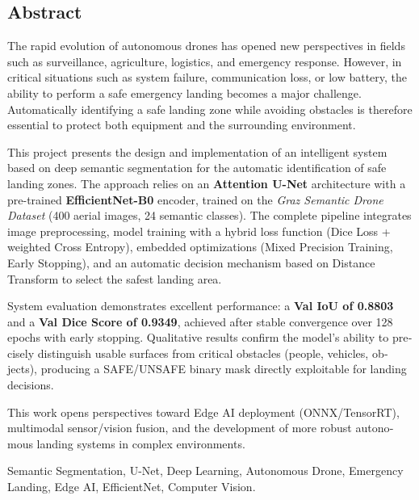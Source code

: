 \begin{otherlanguage}{english}
\chapter*{Abstract}

The rapid evolution of autonomous drones has opened new perspectives in fields such as surveillance, agriculture, logistics, and emergency response. However, in critical situations such as system failure, communication loss, or low battery, the ability to perform a safe emergency landing becomes a major challenge. Automatically identifying a safe landing zone while avoiding obstacles is therefore essential to protect both equipment and the surrounding environment.

This project presents the design and implementation of an intelligent system based on deep semantic segmentation for the automatic identification of safe landing zones. The approach relies on an \textbf{Attention U-Net} architecture with a pre-trained \textbf{EfficientNet-B0} encoder, trained on the \textit{Graz Semantic Drone Dataset} (400 aerial images, 24 semantic classes). The complete pipeline integrates image preprocessing, model training with a hybrid loss function (Dice Loss + weighted Cross Entropy), embedded optimizations (Mixed Precision Training, Early Stopping), and an automatic decision mechanism based on Distance Transform to select the safest landing area.

System evaluation demonstrates excellent performance: a \textbf{Val IoU of 0.8803} and a \textbf{Val Dice Score of 0.9349}, achieved after stable convergence over 128 epochs with early stopping. Qualitative results confirm the model's ability to precisely distinguish usable surfaces from critical obstacles (people, vehicles, objects), producing a SAFE/UNSAFE binary mask directly exploitable for landing decisions.

This work opens perspectives toward Edge AI deployment (ONNX/TensorRT), multimodal sensor/vision fusion, and the development of more robust autonomous landing systems in complex environments.

\vspace{0.8em}
\begin{tcolorbox}[
  colback=ENIADLightBlue!40, colframe=ENIADBlue,
  title={\textbf{Keywords}}, fonttitle=\bfseries\small,
  arc=4pt, boxrule=0.8pt
]
  Semantic Segmentation, U-Net, Deep Learning, Autonomous Drone, Emergency Landing, Edge AI, EfficientNet, Computer Vision.
\end{tcolorbox}
\end{otherlanguage}

